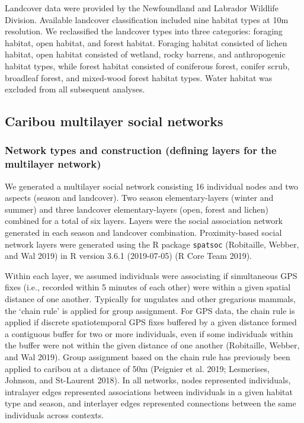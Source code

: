 \documentclass[]{article}
\begin{document}
Landcover data were provided by the Newfoundland and Labrador Wildlife Division.
Available landcover classification included nine habitat types at 10m resolution. We reclassified the landcover types into three
categories: foraging habitat, open habitat, and forest habitat. Foraging habitat
 consisted of lichen habitat, open habitat
consisted of wetland, rocky barrens, and anthropogenic habitat types, while
forest habitat consisted of coniferous forest, conifer scrub, broadleaf forest,
and mixed-wood forest habitat types. Water habitat was excluded from all
subsequent analyses.

\hypertarget{caribou-multilayer-social-networks}{%
\subsection{Caribou multilayer social networks}\label{caribou-multilayer-social-networks}}

\hypertarget{network-types-and-construction-defining-layers-for-the-multilayer-network}{%
\subsubsection{Network types and construction (defining layers for the multilayer network)}\label{network-types-and-construction-defining-layers-for-the-multilayer-network}}

We generated a multilayer social network consisting 16 individual nodes and two
aspects (season and landcover). Two season elementary-layers (winter and summer)
and three landcover elementary-layers (open, forest and lichen) combined for a
total of six layers. Layers were the social association network generated in
each season and landcover combination. Proximity-based social network layers
were generated using the R package \texttt{spatsoc} (Robitaille, Webber, and Wal 2019) in R version 3.6.1 (2019-07-05) (R Core Team 2019).

Within each layer, we assumed individuals were associating if simultaneous GPS
fixes (i.e., recorded within 5 minutes of each other) were within a given
spatial distance of one another. Typically for ungulates and other gregarious
mammals, the `chain rule' is applied for group assignment. For GPS data, the
chain rule is applied if discrete spatiotemporal GPS fixes buffered by a given
distance formed a contiguous buffer for two or more individuals, even if some
individuals within the buffer were not within the given distance of one another
(Robitaille, Webber, and Wal 2019). Group assignment based on the chain rule has previously been
applied to caribou at a distance of 50m (Peignier et al. 2019; Lesmerises, Johnson, and St-Laurent 2018). In
all networks, nodes represented individuals, intralayer edges represented
associations between individuals in a given habitat type and season, and
interlayer edges represented connections between the same individuals across
contexts.
\end{document}
